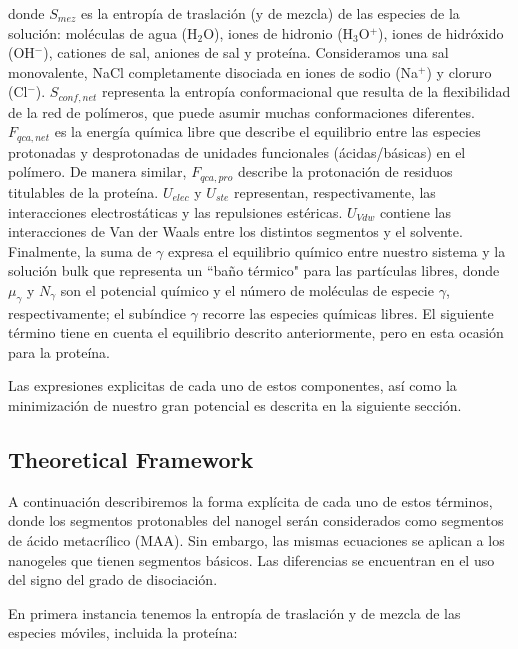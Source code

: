 \noindent donde $S_{mez}$ es la entrop\'ia de traslaci\'on (y de mezcla) de las especies de la soluci\'on: mol\'eculas de agua (H$_2$O), iones de hidronio (H$_3$O$^+$), iones de hidr\'oxido (OH$^- $), cationes de sal, aniones de sal y prote\'ina.
Consideramos una sal monovalente, NaCl completamente disociada en iones de sodio (Na$^+$) y cloruro (Cl$^-$).
$S_{conf,net}$ representa la entrop\'ia conformacional que resulta de la flexibilidad de la red de pol\'imeros, que puede asumir muchas conformaciones diferentes.
$F_{qca,net}$ es la energ\'ia qu\'imica libre que describe el equilibrio entre las especies protonadas y desprotonadas de unidades funcionales (\'acidas/b\'asicas) en el pol\'imero.
De manera similar, $F_{qca,pro}$ describe la protonaci\'on de residuos titulables de la prote\'ina.
$U_{elec}$ y $U_{ste}$ representan, respectivamente, las interacciones electrost\'aticas y las repulsiones est\'ericas.
$U_{Vdw}$ contiene las interacciones de Van der Waals entre los distintos segmentos y el solvente.
Finalmente, la suma de $\gamma$ expresa el equilibrio qu\'imico entre nuestro sistema y la soluci\'on bulk que representa un ``ba\~no t\'ermico" para las part\'iculas libres, donde $\mu_\gamma$ y $N_\gamma$ son el potencial qu\'imico y el n\'umero de mol\'eculas de especie $\gamma$, respectivamente;
el sub\'indice $\gamma$ recorre las especies qu\'imicas libres.
El siguiente t\'ermino tiene en cuenta el equilibrio descrito anteriormente, pero en esta ocasi\'on para la prote\'ina.

Las expresiones explicitas de cada uno de estos componentes, as\'i como la minimizaci\'on de nuestro gran potencial es descrita en la siguiente secci\'on.



\subsection{Theoretical Framework}\label{sec:esf:tm}

A continuaci\'on describiremos la forma expl\'icita de cada uno de estos t\'erminos, donde los segmentos protonables del nanogel ser\'an considerados como segmentos de \'acido metacrílico (MAA). Sin embargo, las mismas ecuaciones se aplican a los nanogeles que tienen segmentos b\'asicos. Las diferencias se encuentran en el uso del signo del grado de disociaci\'on.

En primera instancia tenemos la entrop\'ia de traslaci\'on y de mezcla de las especies m\'oviles, incluida la prote\'ina:


